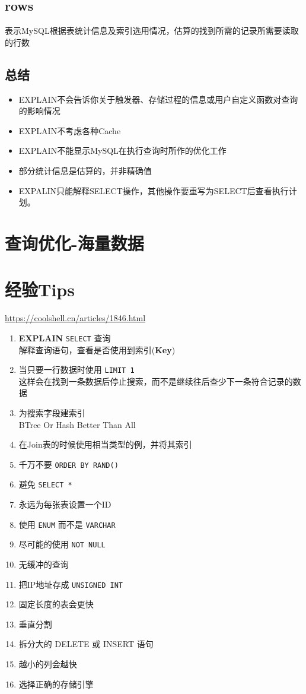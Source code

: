 \documentclass[UTF8,a4paper,12pt]{ctexbook}
\begin{document}
		\subsection{rows}
			表示MySQL根据表统计信息及索引选用情况，估算的找到所需的记录所需要读取的行数
	
		\subsection{总结}
			\begin{itemize}
				\item EXPLAIN不会告诉你关于触发器、存储过程的信息或用户自定义函数对查询的影响情况
				\item EXPLAIN不考虑各种Cache
				\item EXPLAIN不能显示MySQL在执行查询时所作的优化工作
				\item 部分统计信息是估算的，并非精确值
				\item EXPALIN只能解释SELECT操作，其他操作要重写为SELECT后查看执行计划。
			\end{itemize}
			

	\section{查询优化-海量数据}
	
	\section{经验Tips}
		\url{https://coolshell.cn/articles/1846.html}
		
		\begin{enumerate}
			\item \textbf{EXPLAIN} \verb|SELECT| 查询 \\ 解释查询语句，查看是否使用到索引(\textbf{Key})
			\item 当只要一行数据时使用 \verb|LIMIT 1|  \\ 这样会在找到一条数据后停止搜索，而不是继续往后查少下一条符合记录的数据
			\item 为搜索字段建索引 \\ BTree Or Hash Better Than All
			\item 在Join表的时候使用相当类型的例，并将其索引
			\item 千万不要 \verb|ORDER BY RAND()|
			\item 避免 \verb|SELECT *|
			\item 永远为每张表设置一个ID
			\item 使用 \verb|ENUM| 而不是 \verb|VARCHAR|
			\item 尽可能的使用 \verb|NOT NULL|
			\item 无缓冲的查询
			\item 把IP地址存成 \verb|UNSIGNED INT|
			\item 固定长度的表会更快
			\item 垂直分割
			\item 拆分大的 DELETE 或 INSERT 语句
			\item 越小的列会越快
			\item 选择正确的存储引擎
		\end{enumerate}
		
\end{document}

